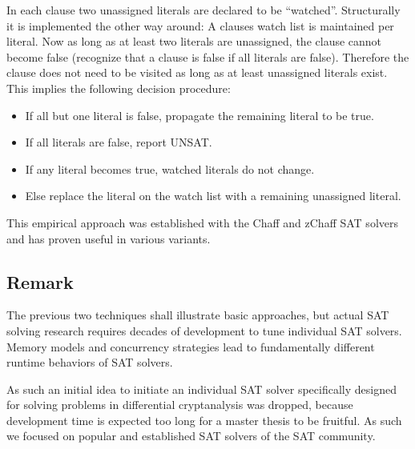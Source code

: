 In each clause two unassigned literals are declared to be \enquote{watched}.
Structurally it is implemented the other way around:
A clauses watch list is maintained per literal.
Now as long as at least two literals are unassigned, the clause cannot become
false (recognize that a clause is false if all literals are false).
Therefore the clause does not need to be visited as long as at least
unassigned literals exist. This implies the following decision procedure:
\begin{itemize}
  \item If all but one literal is false, propagate the remaining literal to be true.
  \item If all literals are false, report UNSAT.
  \item If any literal becomes true, watched literals do not change.
  \item Else replace the literal on the watch list with a remaining unassigned literal.
\end{itemize}

This empirical approach was established with the Chaff and zChaff SAT
solvers~\cite{moskewicz2001chaff} and has proven useful in various variants.

\subsection{Remark}
\label{sec:sat-remark}
%
The previous two techniques shall illustrate basic approaches, but actual SAT
solving research requires decades of development to tune individual SAT solvers.
Memory models and concurrency strategies lead to fundamentally different runtime
behaviors of SAT solvers.

As such an initial idea to initiate an individual SAT solver specifically designed for
solving problems in differential cryptanalysis was dropped, because development time
is expected too long for a master thesis to be fruitful. As such we focused on popular
and established SAT solvers of the SAT community.

